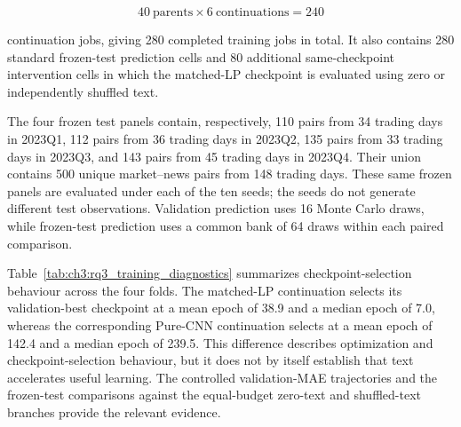 \[
40\ \text{parents}\times6\ \text{continuations}=240
\]

continuation jobs, giving 280 completed training jobs in total. It also
contains 280 standard frozen-test prediction cells and 80 additional
same-checkpoint intervention cells in which the matched-LP checkpoint is
evaluated using zero or independently shuffled text.

The four frozen test panels contain, respectively, 110 pairs from 34 
trading days in 2023Q1, 112 pairs from 36 trading days in 2023Q2, 135 pairs from
33 trading days in 2023Q3, and 143 pairs from 45 trading days in 2023Q4. Their union
contains 500 unique market--news pairs from 148 trading days. These same
frozen panels are evaluated under each of the ten seeds; the seeds do not
generate different test observations. Validation prediction uses 16 Monte
Carlo draws, while frozen-test prediction uses a common bank of 64 draws
within each paired comparison. 

Table~\ref{tab:ch3:rq3_training_diagnostics} summarizes checkpoint-selection
behaviour across the four folds. The matched-LP continuation selects its
validation-best checkpoint at a mean epoch of 38.9 and a median epoch of 7.0,
whereas the corresponding Pure-CNN continuation selects at a mean epoch of
142.4 and a median epoch of 239.5. This difference describes optimization and
checkpoint-selection behaviour, but it does not by itself establish that text
accelerates useful learning. The controlled validation-MAE trajectories and
the frozen-test comparisons against the equal-budget zero-text and
shuffled-text branches provide the relevant evidence.


